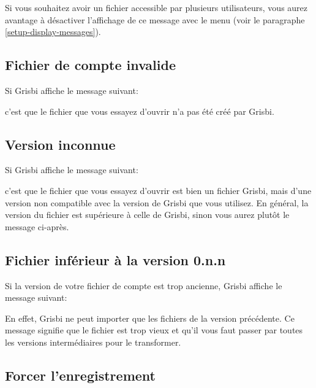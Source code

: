Si vous souhaitez avoir un fichier accessible par plusieurs utilisateurs, vous
aurez avantage à désactiver l'affichage de ce message avec le menu
 (voir le paragraphe \vref{setup-display-messages}).

\subsection{Fichier de compte invalide}

Si Grisbi affiche le message suivant: 

\begin{center}
\end{center}

c'est que le fichier que vous essayez d'ouvrir n'a pas été créé par Grisbi.

\subsection{Version inconnue}

Si Grisbi affiche le message suivant: 

\begin{center}
\end{center}

c'est que le fichier que vous essayez d'ouvrir est bien un fichier Grisbi, mais d'une
version non compatible avec la version de Grisbi que vous utilisez. En général,
la version du fichier est supérieure à celle de Grisbi, sinon vous aurez plutôt 
le message ci-après.

\subsection{Fichier inférieur à la version 0.n.n}

Si la version de votre fichier de compte est trop ancienne, Grisbi affiche 
le message suivant: 

\begin{center}
\end{center}

En effet, Grisbi ne peut importer que les fichiers de la version précédente. Ce message
signifie que le fichier est trop vieux et qu'il vous faut passer par toutes les 
versions intermédiaires pour le transformer.

\subsection{Forcer l'enregistrement}

